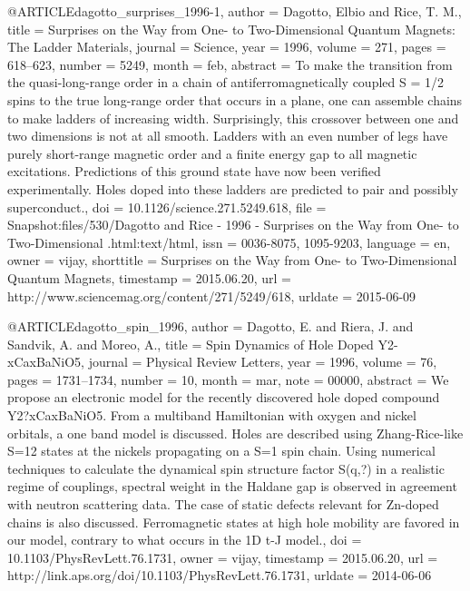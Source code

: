@ARTICLE{dagotto_surprises_1996-1,
  author = {Dagotto, Elbio and Rice, T. M.},
  title = {Surprises on the {Way} from {One}- to {Two}-{Dimensional} {Quantum}
	{Magnets}: {The} {Ladder} {Materials}},
  journal = {Science},
  year = {1996},
  volume = {271},
  pages = {618--623},
  number = {5249},
  month = feb,
  abstract = {To make the transition from the quasi-long-range order in a chain
	of antiferromagnetically coupled S = 1/2 spins to the true long-range
	order that occurs in a plane, one can assemble chains to make ladders
	of increasing width. Surprisingly, this crossover between one and
	two dimensions is not at all smooth. Ladders with an even number
	of legs have purely short-range magnetic order and a finite energy
	gap to all magnetic excitations. Predictions of this ground state
	have now been verified experimentally. Holes doped into these ladders
	are predicted to pair and possibly superconduct.},
  doi = {10.1126/science.271.5249.618},
  file = {Snapshot:files/530/Dagotto and Rice - 1996 - Surprises on the Way from One- to Two-Dimensional .html:text/html},
  issn = {0036-8075, 1095-9203},
  language = {en},
  owner = {vijay},
  shorttitle = {Surprises on the {Way} from {One}- to {Two}-{Dimensional} {Quantum}
	{Magnets}},
  timestamp = {2015.06.20},
  url = {http://www.sciencemag.org/content/271/5249/618},
  urldate = {2015-06-09}
}

@ARTICLE{dagotto_spin_1996,
  author = {Dagotto, E. and Riera, J. and Sandvik, A. and Moreo, A.},
  title = {Spin {Dynamics} of {Hole} {Doped} {Y}2-{xCaxBaNiO}5},
  journal = {Physical Review Letters},
  year = {1996},
  volume = {76},
  pages = {1731--1734},
  number = {10},
  month = mar,
  note = {00000},
  abstract = {We propose an electronic model for the recently discovered hole doped
	compound Y2?xCaxBaNiO5. From a multiband Hamiltonian with oxygen
	and nickel orbitals, a one band model is discussed. Holes are described
	using Zhang-Rice-like S=12 states at the nickels propagating on a
	S=1 spin chain. Using numerical techniques to calculate the dynamical
	spin structure factor S(q,?) in a realistic regime of couplings,
	spectral weight in the Haldane gap is observed in agreement with
	neutron scattering data. The case of static defects relevant for
	Zn-doped chains is also discussed. Ferromagnetic states at high hole
	mobility are favored in our model, contrary to what occurs in the
	1D t-J model.},
  doi = {10.1103/PhysRevLett.76.1731},
  owner = {vijay},
  timestamp = {2015.06.20},
  url = {http://link.aps.org/doi/10.1103/PhysRevLett.76.1731},
  urldate = {2014-06-06}
}

